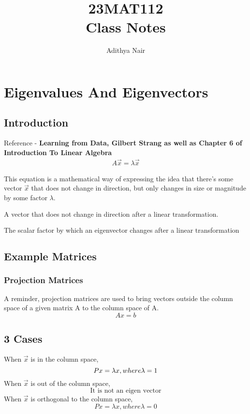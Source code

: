 \documentclass[twoside]{report}
\title{\Huge{23MAT112}\\ Class Notes}
\author{\huge{Adithya Nair}}
\date{}
\begin{document}
\maketitle
\newpage %
\tableofcontents
\chapter{Eigenvalues And Eigenvectors}
\section{Introduction} %
Reference - \textbf{Learning from Data, Gilbert Strang as well as Chapter 6 of Introduction To Linear Algebra}
\begin{align*}
	A \vec{x} = \lambda \vec{x}
\end{align*}

This equation is a mathematical way of expressing the idea that there's some vector $\vec{x}$ that does not change in direction, but only changes in size or magnitude by some factor $\lambda$.


\begin{definition}[Eigenvector]
   A vector that does not change in direction after a linear transformation.
\end{definition}
\begin{definition}[Eigenvalue]
The scalar factor by which an eigenvector changes after a linear transformation	
\end{definition}
\section{Example Matrices} %
\subsection{Projection Matrices}
A reminder, projection matrices are used to bring vectors outside the column space of a given matrix A to the column space of A.
\[
	Ax = b
\]
\section*{3 Cases}
When $\vec{x}$ is in the column space,
\[
	Px = \lambda x, where \\ \lambda = 1
\]
When $\vec{x}$ is out of the column space,
\[
   \text{It is not an eigen vector}
\]
When $\vec{x}$ is orthogonal to the column space,
\[
	Px = \lambda x, where \lambda = 0
\]
\end{document}
